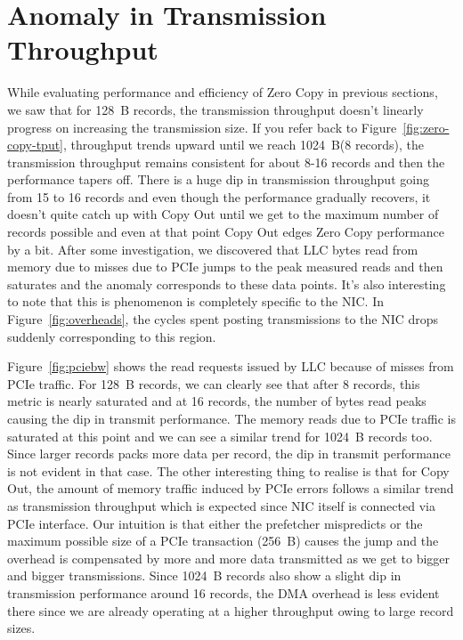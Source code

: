 \section{Anomaly in Transmission Throughput}
\label{sec:anomaly}
While evaluating performance and efficiency of Zero Copy in previous sections, we saw that for 128~B records, the transmission throughput doesn't linearly progress 
on increasing the transmission size. If you refer back to Figure~\ref{fig:zero-copy-tput}, throughput trends upward until we reach 1024~B(8 records), the transmission throughput remains consistent for about 8-16 records and 
then the performance tapers off. There is a huge dip in transmission throughput going from 15 to 16 records and even though the performance gradually recovers, it doesn't quite 
catch up with Copy Out until we get to the maximum number of records possible and even at that point Copy Out edges Zero Copy performance by a bit. After some investigation, we discovered 
that LLC bytes read from memory due to misses due to PCIe jumps to the peak measured reads and then saturates and the anomaly corresponds to these data points. It's also interesting to note 
that this is phenomenon is completely specific to the NIC. In Figure~\ref{fig:overheads}, the cycles spent posting transmissions to the NIC drops suddenly corresponding to this region.

Figure~\ref{fig:pciebw} shows the read requests issued by LLC because of misses from PCIe traffic. For 128~B records, we can clearly see that after 8 records, this metric is 
nearly saturated and at 16 records, the number of bytes read peaks causing the dip in transmit performance. The memory reads due to PCIe traffic is saturated at this point and 
we can see a similar trend for 1024~B records too. Since larger records packs more data per record, the dip in transmit performance is not evident in that case. The other interesting 
thing to realise is that for Copy Out, the amount of memory traffic induced by PCIe errors follows a similar trend as transmission throughput which is expected since 
NIC itself is connected via PCIe interface. Our intuition is that either the prefetcher mispredicts or the maximum possible size of a PCIe transaction (256~B) causes the jump 
and the overhead is compensated by more and more data transmitted as we get to bigger and bigger transmissions. Since 1024~B records also show a slight dip in transmission performance 
around 16 records, the DMA overhead is less evident there since we are already operating at a higher throughput owing to large record sizes.

